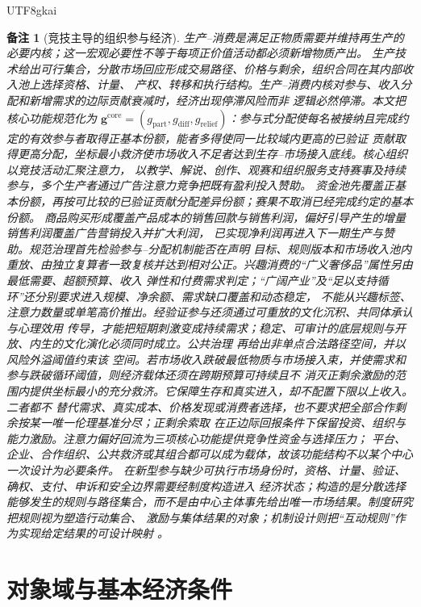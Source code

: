 \documentclass[12pt,a4paper,openany]{report}
\newtheorem{remark}{备注}[chapter]
\begin{document}
\begin{CJK*}{UTF8}{gkai}
\begin{remark}[竞技主导的组织参与经济]
生产--消费是满足正物质需要并维持再生产的必要内核；这一宏观必要性不等于每项正价值活动都必须新增物质产出。
生产技术给出可行集合，分散市场回应形成交易路径、价格与剩余，组织合同在其内部收入池上选择资格、计量、
产权、转移和执行结构。生产--消费内核对参与、收入分配和新增需求的边际贡献衰减时，经济出现停滞风险而非
逻辑必然停滞。本文把核心功能规范化为
\(
\mathbf g^{\mathrm{core}}
=(g_{\mathrm{part}},g_{\mathrm{diff}},g_{\mathrm{relief}})
\)：参与式分配使每名被接纳且完成约定的有效参与者取得正基本份额，能者多得使同一比较域内更高的已验证
贡献取得更高分配，坐标最小救济使市场收入不足者达到生存--市场接入底线。核心组织以竞技活动汇聚注意力，
以教学、解说、创作、观赛和组织服务支持赛事及持续参与，多个生产者通过广告注意力竞争把既有盈利投入赞助。
资金池先覆盖正基本份额，再按可比较的已验证贡献分配差异份额；赛果不取消已经完成约定的基本份额。
商品购买形成覆盖产品成本的销售回款与销售利润，偏好引导产生的增量销售利润覆盖广告营销投入并扩大利润，
已实现净利润再进入下一期生产与赞助。规范治理首先检验参与--分配机制能否在声明
目标、规则版本和市场收入池内重放、由独立复算者一致复核并达到相对公正。兴趣消费的“广义奢侈品”属性另由
最低需要、超额预算、收入
弹性和付费需求判定；“广阔产业”及“足以支持循环”还分别要求进入规模、净余额、需求缺口覆盖和动态稳定，
不能从兴趣标签、注意力数量或单笔高价推出。经验证参与还须通过可重放的文化沉积、共同体承认与心理效用
传导，才能把短期刺激变成持续需求；稳定、可审计的底层规则与开放、内生的文化演化必须同时成立。公共治理
再给出非单点合法路径空间，并以风险外溢阈值约束该
空间。若市场收入跌破最低物质与市场接入束，并使需求和参与跌破循环阈值，则经济载体还须在跨期预算可持续且不
消灭正剩余激励的范围内提供坐标最小的充分救济。它保障生存和真实进入，却不配置下限以上收入。二者都不
替代需求、真实成本、价格发现或消费者选择，也不要求把全部合作剩余按某一唯一伦理基准分尽；正剩余索取
在正边际回报条件下保留投资、组织与能力激励。注意力偏好回流为三项核心功能提供竞争性资金与选择压力；
平台、企业、合作组织、公共救济或其组合都可以成为载体，故该功能结构不以某个中心一次设计为必要条件。
在新型参与缺少可执行市场身份时，资格、计量、验证、确权、支付、申诉和安全边界需要经制度构造进入
经济状态；构造的是分散选择能够发生的规则与路径集合，而不是由中心主体事先给出唯一市场结果。制度研究把规则视为塑造行动集合、
激励与集体结果的对象；机制设计则把“互动规则”作为实现给定结果的可设计映射
\cite{Ostrom1990Commons,Myerson1981OptimalAuction}。
\end{remark}

\section{对象域与基本经济条件}


\end{CJK*}
\end{document}
